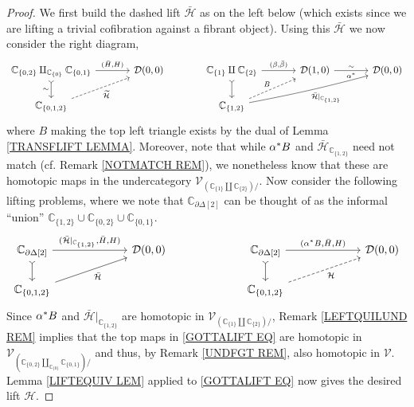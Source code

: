 \documentclass[a4paper,10pt
,draft
]{article}%
\numberwithin{equation}{section}
\numberwithin{figure}{section}
\theoremstyle{definition} %
\newcommand{\V}{\ensuremath{\mathcal V}}
\newcommand{\1}{\ensuremath{\mathbbm 1}}%
\begin{document}
\begin{proof}
We first build the dashed lift $\bar{\mathcal{H}}$
as on the left below (which exists since we are lifting a trivial cofibration against a fibrant object).
Using this $\bar{\mathcal{H}}$ we now consider the right diagram,
\begin{equation}
\begin{tikzcd}[column sep = 35pt]
	\mathbb{C}_{\{0,2\}} 
	\amalg_{\mathbb{C}_{\{0\}}}
	\mathbb{C}_{\{0,1\}} 
	\ar[rightarrowtail]{d}[swap]{\sim}
	\arrow{r}{(\bar{H},H)}
&
	\mathcal{D}(0,0)
&%
	\mathbb{C}_{\{1\}} \amalg \mathbb{C}_{\{2\}}
	\ar[rightarrowtail]{d}
	\arrow{r}{(\beta,\bar{\beta})}
&
	\mathcal{D}(1,0)
	\ar{r}{\sim}[swap]{\alpha^{\**}}
&
	\mathcal{D}(0,0) 
\\
	\mathbb{C}_{\{0,1,2\}}
	\arrow[dashed]{ur}[swap]{\widetilde{\mathcal{H}}}
&
&%
	\mathbb{C}_{\{1,2\}}
	\ar[dashed]{ru}{B}
	\ar[bend right=2]{rru}[swap]{\bar{\mathcal{H}}|_{\mathbb{C}_{\{1,2\}}}}
&
&
\end{tikzcd}
\end{equation}
where $B$ making the top left triangle exists by the dual of Lemma \ref{TRANSFLIFT LEMMA}.
Moreover, note that while 
$\alpha^{\**}B$ and $\bar{\mathcal{H}}_{\mathbb{C}_{\{1,2\}}}$
need not match (cf. Remark \ref{NOTMATCH REM}),
we nonetheless know that these are homotopic maps
in the undercategory $\V_{\left(\mathbb{C}_{\{1\}} \amalg \mathbb{C}_{\{2\}}\right)/}$.
Now consider the following lifting problems, 
where we note that $\mathbb{C}_{\partial \Delta[2]}$ 
can be thought of as the informal ``union''
$\mathbb{C}_{\{1,2\}} \cup \mathbb{C}_{\{0,2\}} \cup \mathbb{C}_{\{0,1\}}$.
\begin{equation}\label{GOTTALIFT EQ}
\begin{tikzcd}[column sep = 65pt]
	\mathbb{C}_{\partial \Delta[2]}
	\ar[rightarrowtail]{d}
	\arrow{r}{(\bar{\mathcal{H}}|_{\mathbb{C}_{\{1,2\}}},\bar{H},H)}
&
	\mathcal{D}(0,0)
&%
	\mathbb{C}_{\partial \Delta[2]}
	\ar[rightarrowtail]{d}
	\arrow{r}{(\alpha^{\**}B,\bar{H},H)}
&
	\mathcal{D}(0,0)
\\
	\mathbb{C}_{\{0,1,2\}} \ar{ru}[swap]{\bar{\mathcal{H}}}
&
&%
	\mathbb{C}_{\{0,1,2\}} \ar[dashed]{ru}[swap]{\mathcal{H}}
&
\end{tikzcd}
\end{equation}
Since $\alpha^{\**}B$ and $\bar{\mathcal{H}}|_{\mathbb{C}_{\{1,2\}}}$
are homotopic in 
$\V_{\left(\mathbb{C}_{\{1\}} \amalg \mathbb{C}_{\{2\}}\right)/}$,
Remark \ref{LEFTQUILUND REM}
implies that the top maps in \eqref{GOTTALIFT EQ}
are homotopic in 
$\V_{\left(
\mathbb{C}_{\{0,2\}} \amalg_{\mathbb{C}_{\{0\}}} \mathbb{C}_{\{0,1\}}
\right)/}$ and thus,
by Remark \ref{UNDFGT REM}, also homotopic in 
$\V$.
Lemma \ref{LIFTEQUIV LEM} applied to \eqref{GOTTALIFT EQ}
now gives the desired lift $\mathcal{H}$.
\end{proof}
\end{document}
